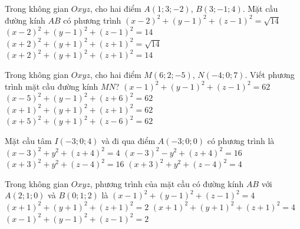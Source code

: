 \begin{ex}%
	Trong không gian $Oxyz$, cho hai điểm  $A\left(1;3;-2\right)$, $B\left(3;-1;4\right)$. Mặt cầu đường kính $AB$ có phương trình
	 \choice
		{$\left(x-2\right)^2+\left(y-1\right)^2+\left(z-1\right)^2=\sqrt{14}$} 
		 {\True $\left(x-2\right)^2+\left(y-1\right)^2+\left(z-1\right)^2=14$}
		{$\left(x+2\right)^2+\left(y+1\right)^2+\left(z+1\right)^2=\sqrt{14}$} 
		 {$\left(x+2\right)^2+\left(y+1\right)^2+\left(z+1\right)^2=14$}
\end{ex}

\begin{ex}%
	Trong không  gian $Oxyz$, cho hai điểm $M\left(6;2;-5\right)$, $N\left(-4;0;7\right)$. Viết phương trình mặt cầu đường kính $MN$?
	 \choice
		{\True $\left(x-1\right)^2+\left(y-1\right)^2+\left(z-1\right)^2=62$} 
		{$\left(x-5\right)^2+\left(y-1\right)^2+\left(z+6\right)^2=62$} 
		{$\left(x+1\right)^2+\left(y+1\right)^2+\left(z+1\right)^2=62$} 
		 {$\left(x+5\right)^2+\left(y+1\right)^2+\left(z-6\right)^2=62$}
\end{ex}

\begin{ex}%
	Mặt cầu tâm $I(-3; 0; 4)$ và đi qua điểm $A(-3; 0; 0)$ có phương trình  là
	 \choice
		 {$(x-3)^2+y^2+(z+4)^2=4$}
		{$(x-3)^2-y^2+(z+4)^2=16$} 
		 {\True $(x+3)^2+y^2+(z-4)^2=16$}
		{$(x+3)^2+y^2+(z-4)^2=4$} 
\end{ex}

\begin{ex}%
	Trong không gian $Oxyz$, phương trình của mặt cầu có đường kính $AB$  với $A\left(2;1;0\right)$ và $B\left(0;1;2\right)$ là
	\choice 
		{$\left(x-1\right)^2+\left(y-1\right)^2+\left(z-1\right)^2=4$} 
		 {$\left(x+1\right)^2+\left(y+1\right)^2+\left(z+1\right)^2=2$}
		 {$\left(x+1\right)^2+\left(y+1\right)^2+\left(z+1\right)^2=4$}
		{\True $\left(x-1\right)^2+\left(y-1\right)^2+\left(z-1\right)^2=2$} 
\end{ex}

